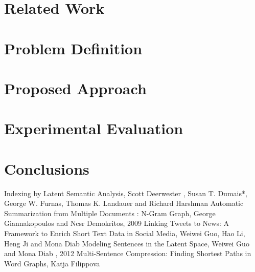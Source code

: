\documentclass{acm_proc_article-sp-sigmod07}
\begin{document}
\section*{Related Work}



\section*{Problem Definition}



\section*{Proposed Approach}


\section*{Experimental Evaluation}


\section*{Conclusions}

\begin{thebibliography}{9}
	Indexing by Latent Semantic Analysis, Scott Deerwester , Susan T. Dumais*, George W. Furnas,  Thomas K. Landauer  and Richard Harshman 
	Automatic Summarization from Multiple Documents : N-Gram Graph, George Giannakopoulos and Ncsr Demokritos, 2009
	Linking Tweets to News: A Framework to Enrich Short Text Data in Social Media, Weiwei Guo, Hao Li, Heng Ji and Mona Diab
	Modeling Sentences in the Latent Space, Weiwei Guo and Mona Diab , 2012
	Multi-Sentence Compression: Finding Shortest Paths in Word Graphs, Katja Filippova 

\end{thebibliography}
\end{document}
